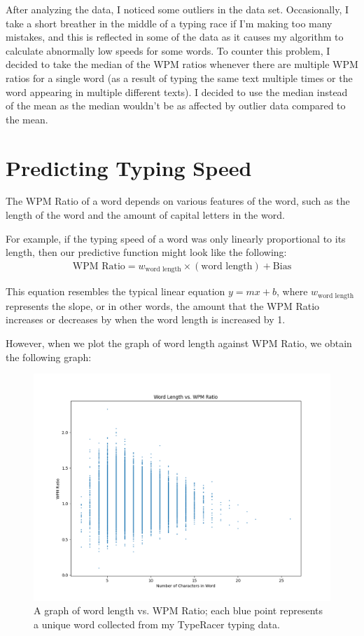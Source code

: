 \documentclass[12pt]{article}
\begin{document}
After analyzing the data, I noticed some outliers in the data set. Occasionally, I take a short breather in the middle of a typing race if I'm making too many mistakes, and this is reflected in some of the data as it causes my algorithm to calculate abnormally low speeds for some words. To counter this problem, I decided to take the median of the WPM ratios whenever there are multiple WPM ratios for a single word (as a result of typing the same text multiple times or the word appearing in multiple different texts). I decided to use the median instead of the mean as the median wouldn't be as affected by outlier data compared to the mean.

\section*{Predicting Typing Speed}

The WPM Ratio of a word depends on various features of the word, such as the length of the word and the amount of capital letters in the word.

For example, if the typing speed of a word was only linearly proportional to its length, then our predictive function might look like the following:
\begin{align*}
	\text{WPM Ratio} = w_{\text{word length}} \times (\text{word length}) + \text{Bias}
\end{align*}

This equation resembles the typical linear equation $y = mx + b$, where $w_{\text{word length}}$ represents the slope, or in other words, the amount that the WPM Ratio increases or decreases by when the word length is increased by 1.

However, when we plot the graph of word length against WPM Ratio, we obtain the following graph:

\begin{figure}[H]
	\caption{A graph of word length vs. WPM Ratio; each blue point represents a unique word collected from my TypeRacer typing data.}
	\includegraphics[width=\linewidth]{word-length-vs-wpm.png}
\end{figure}
\end{document}
